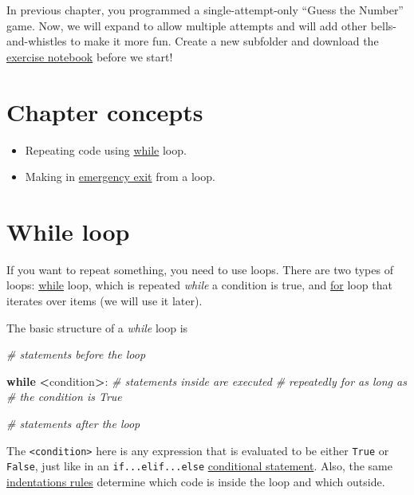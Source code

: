 \documentclass[
]{book}
\newenvironment{Shaded}{\begin{snugshade}}{\end{snugshade}}
\newcommand{\CommentTok}[1]{\textcolor[rgb]{0.56,0.35,0.01}{\textit{#1}}}
\newcommand{\ControlFlowTok}[1]{\textcolor[rgb]{0.13,0.29,0.53}{\textbf{#1}}}
\newcommand{\NormalTok}[1]{#1}
\newcommand{\OperatorTok}[1]{\textcolor[rgb]{0.81,0.36,0.00}{\textbf{#1}}}
\providecommand{\tightlist}{%
  \setlength{\itemsep}{0pt}\setlength{\parskip}{0pt}}
\begin{document}
In previous chapter, you programmed a single-attempt-only ``Guess the Number'' game. Now, we will expand to allow multiple attempts and will add other bells-and-whistles to make it more fun. Create a new subfolder and download the \href{notebooks/Seminar\%2003.\%20Guess\%20the\%20number\%20-\%20multi\%20round.ipynb}{exercise notebook} before we start!

\hypertarget{chapter-concepts-2}{%
\section{Chapter concepts}\label{chapter-concepts-2}}

\begin{itemize}
\tightlist
\item
  Repeating code using \protect\hyperlink{while-loop}{while} loop.
\item
  Making in \protect\hyperlink{break}{emergency exit} from a loop.
\end{itemize}

\hypertarget{while-loop}{%
\section{While loop}\label{while-loop}}

If you want to repeat something, you need to use loops. There are two types of loops: \href{https://docs.python.org/3/reference/compound_stmts.html\#the-while-statement}{while} loop, which is repeated \emph{while} a condition is true, and \href{https://docs.python.org/3/reference/compound_stmts.html\#the-for-statement}{for} loop that iterates over items (we will use it later).

The basic structure of a \emph{while} loop is

\begin{Shaded}
\begin{Highlighting}[]
\CommentTok{\# statements before the loop}

\ControlFlowTok{while} \OperatorTok{\textless{}}\NormalTok{condition}\OperatorTok{\textgreater{}}\NormalTok{:}
    \CommentTok{\# statements inside are executed}
    \CommentTok{\# repeatedly for as long as}
    \CommentTok{\# the condition is True}
    
\CommentTok{\# statements after the loop}
\end{Highlighting}
\end{Shaded}

The \texttt{\textless{}condition\textgreater{}} here is any expression that is evaluated to be either \texttt{True} or \texttt{False}, just like in an \texttt{if...elif...else} \protect\hyperlink{comparisons}{conditional statement}. Also, the same \protect\hyperlink{indentation}{indentations rules} determine which code is inside the loop and which outside.
\end{document}
